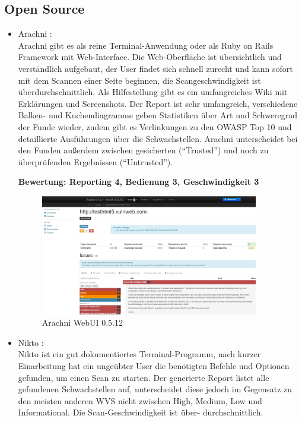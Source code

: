 \documentclass[12pt,oneside,a4paper,parskip,pointlessnumbers]{scrbook}
\begin{document}
    \subsection{Open Source}
        \begin{itemize}
          \item Arachni \cite{Arachni}:\\
            Arachni gibt es als reine Terminal-Anwendung oder als Ruby on Rails Framework mit Web-Interface. Die Web-Oberfläche ist übersichtlich und verständlich aufgebaut, der User findet sich schnell zurecht und kann sofort mit dem Scannen einer Seite beginnen, die Scangeschwindigkeit ist überdurchschnittlich. Als Hilfestellung gibt es ein umfangreiches Wiki mit Erklärungen und Screenshots. Der Report ist sehr umfangreich, verschiedene Balken- und Kuchendiagramme geben Statistiken über Art und Schweregrad der Funde wieder, zudem gibt es Verlinkungen zu den OWASP Top 10 und detaillierte Ausführungen über die Schwachstellen. Arachni unterscheidet bei den Funden außerdem zwischen gesicherten (``Trusted'') und noch zu überprüfenden Ergebnissen (``Untrusted'').

            \textbf{Bewertung: Reporting 4, Bedienung 3, Geschwindigkeit 3}
            \begin{figure}[H]
              \centering
              \includegraphics[width=0.9\textwidth]{Images/Arachni}
              \caption[Arachni WebUI 0.5.12]{Arachni WebUI 0.5.12}
            \end{figure}
          \item Nikto \cite{Nikto}:\\
            Nikto ist ein gut dokumentiertes Terminal-Programm, nach kurzer Einarbeitung hat ein ungeübter User die benötigten Befehle und Optionen gefunden, um einen Scan zu starten.
            Der generierte Report listet alle gefundenen Schwachstellen auf, unterscheidet diese jedoch im Gegensatz zu den meisten anderen WVS nicht zwischen High, Medium, Low und Informational. Die Scan-Geschwindigkeit ist über- durchschnittlich.


\end{itemize}
\end{document}
